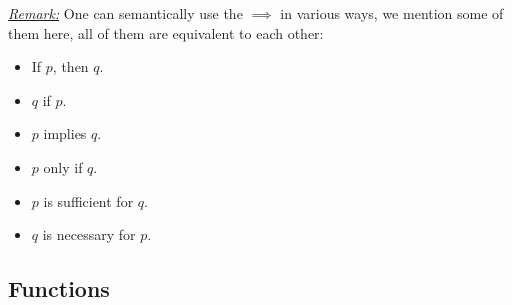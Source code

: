 \documentclass{article}
\begin{document}
\textit{\underline{Remark:}} One can semantically use the $\implies$ in various ways, we mention some of them here, all of them are equivalent to each other: 
\begin{itemize}
	\item  If $p$, then $q$.
	\item $q$ if $p$.
	\item $p$ implies $q$.
	\item $p$ only if $q$.
	\item $p$ is sufficient for $q$.
	\item $q$ is necessary for $p$.
\end{itemize}

\subsection{Functions}




\end{document}
